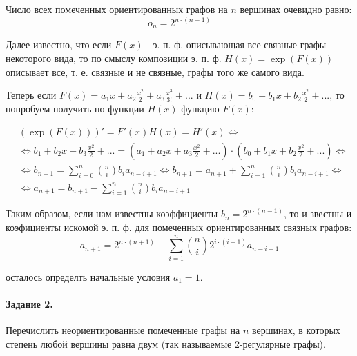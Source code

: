 \documentclass[a4paper,12pt]{article}
\begin{document}
\begin{Solution}

Число всех помеченных ориентированных графов на $n$ вершинах очевидно равно:
\[
	o_n = 2^{n\cdot \left(n-1\right)}
\]

Далее известно, что если $F\left(x\right)$ - э. п. ф. описывающая все связные графы некоторого вида, то по смыслу композиции э. п. ф. $H\left(x\right) = \exp\left(F\left(x\right)\right)$ описывает все, т. е. связные и не связные, графы того же самого вида.

Теперь если $F\left(x\right) = a_1 x + a_2 \frac{x^2}{2} + a_3 \frac{x^3}{3!} + ...$ и $H\left(x\right) = b_0 + b_1 x + b_2 \frac{x^2}{2} + ...$, то попробуем получить по функции $H\left(x\right)$ функцию $F\left(x\right)$:

\[
	\begin{split}
		& \left(\exp\left(F\left(x\right)\right)\right)' = F'\left(x\right) H\left(x\right) = H'\left(x\right) \Leftrightarrow \\
		& \Leftrightarrow b_1 + b_2 x + b_3 \frac{x^2}{2} + ... = \left(a_1 + a_2 x + a_3 \frac{x^2}{2} + ...\right)\cdot\left(b_0 + b_1 x + b_2 \frac{x^2}{2} + ...\right) \Leftrightarrow \\
		& \Leftrightarrow b_{n+1} = \sum_{i=0}^n \binom{n}{i} b_i a_{n-i+1} \Leftrightarrow b_{n+1} = a_{n+1} + \sum_{i=1}^n \binom{n}{i} b_i a_{n-i+1} \Leftrightarrow \\
		& \Leftrightarrow a_{n+1} = b_{n+1} - \sum_{i=1}^n \binom{n}{i} b_i a_{n-i+1}
	\end{split}
\]

Таким образом, если нам известны коэффициенты $b_n = 2^{n\cdot\left(n-1\right)}$, то и звестны и коэфициенты искомой э. п. ф. для помеченных ориентированных связных графов:
\[
	a_{n+1} = 2^{n\cdot\left(n+1\right)} - \sum_{i=1}^{n} \binom{n}{i} 2^{i\cdot\left(i-1\right)} a_{n-i+1}
\]

осталось определть начальные условия $a_1 = 1$.
\end{Solution}

\paragraph{Задание 2.} Перечислить неориентированные помеченные графы на $n$ вершинах, в которых степень любой вершины равна двум (так называемые 2-регулярные графы).
\end{document}
